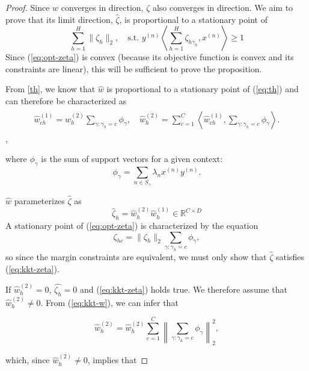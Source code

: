 \documentclass{article}
\theoremstyle{plain}
\theoremstyle{definition}
\theoremstyle{remark}
\begin{document}
\begin{proof}
Since $w$ converges in direction, $\zeta$ also converges in direction. We aim to prove that its limit direction, $\hat{\zeta}$, is proportional to a stationary point of
\begin{equation}
    \label{eq:opt-zeta}
    \sum_{h=1}^H\|\zeta_h\|_2,\quad\text{s.t. }y^{(n)}\left\langle\sum_{h=1}^H\zeta_{h\gamma_h},x^{(n)}\right\rangle\geq1
\end{equation}
Since (\ref{eq:opt-zeta}) is convex (because its objective function is convex and its constraints are linear), this will be sufficient to prove the proposition.

From \cref{th}, we know that $\hat{w}$ is proportional to a stationary point of (\ref{eq:th}) and can therefore be characterized as
\begin{align}
\begin{aligned}
\label{eq:kkt-w}
\hat{w}^{(1)}_{ch}=\hat{w}^{(2)}_h\sum_{\gamma:\gamma_h=c}\phi_{\gamma},\quad
\hat{w}^{(2)}_h=\sum_{c=1}^C\left\langle \hat{w}^{(1)}_{ch},\sum_{\gamma:\gamma_h=c}\phi_{\gamma}\right\rangle.
\end{aligned}
\end{align},

where $\phi_{\gamma}$ is the sum of support vectors for a given context:
\begin{equation}
    \phi_{\gamma}=\sum_{n\in S_{\gamma}}\lambda_nx^{(n)}y^{(n)}.
\end{equation}

$\hat{w}$ parameterizes $\hat{\zeta}$ as
\begin{equation}
    \hat{\zeta}_h=\hat{w}^{(2)}_h\hat{w}^{(1)}_{h}\in\mathbb{R}^{C\times D}
\end{equation}
A stationary point of (\ref{eq:opt-zeta}) is characterized by the equation
\begin{equation}
\label{eq:kkt-zeta}
    \zeta_{hc}=\|\zeta_h\|_2\sum_{\gamma:\gamma_h=c}\phi_{\gamma},
\end{equation}
so since the margin constraints are equivalent, we must only show that $\hat{\zeta}$ satisfies (\ref{eq:kkt-zeta}).

If $\hat{w}^{(2)}_h=0$, $\hat{\zeta_h}=0$ and (\ref{eq:kkt-zeta}) holds true.
We therefore assume that $\hat{w}^{(2)}_h\neq0$.
From (\ref{eq:kkt-w}), we can infer that

$$
\hat{w}_h^{(2)}=\hat{w}_h^{(2)}\sum_{c=1}^C\left\|\sum_{\gamma:\gamma_h=c}\phi_{\gamma}\right\|_2^2,
$$

which, since $\hat{w}_h^{(2)}\neq0$, implies that


\end{proof}
\end{document}
